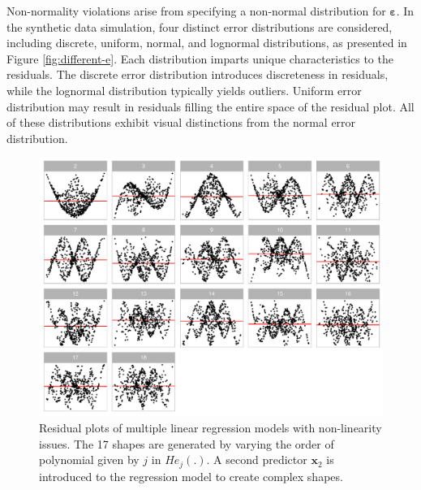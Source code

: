 \documentclass[]{interact}
\theoremstyle{plain}%
\theoremstyle{definition}
\theoremstyle{remark}
\begin{document}
Non-normality violations arise from specifying a non-normal distribution
for \(\boldsymbol{\varepsilon}\). In the synthetic data simulation, four
distinct error distributions are considered, including discrete,
uniform, normal, and lognormal distributions, as presented in Figure
\ref{fig:different-e}. Each distribution imparts unique characteristics
to the residuals. The discrete error distribution introduces
discreteness in residuals, while the lognormal distribution typically
yields outliers. Uniform error distribution may result in residuals
filling the entire space of the residual plot. All of these
distributions exhibit visual distinctions from the normal error
distribution.

\begin{figure}[!h]

{\centering \includegraphics[width=1\linewidth]{paper_files/figure-latex/different-j-x2-1} 

}

\caption{Residual plots of multiple linear regression models with non-linearity issues. The 17 shapes are generated by varying the order of polynomial given by $j$ in $He_j(.)$. A second predictor $\boldsymbol{x}_2$ is introduced to the regression model to create complex shapes.}\label{fig:different-j-x2}
\end{figure}
\end{document}
